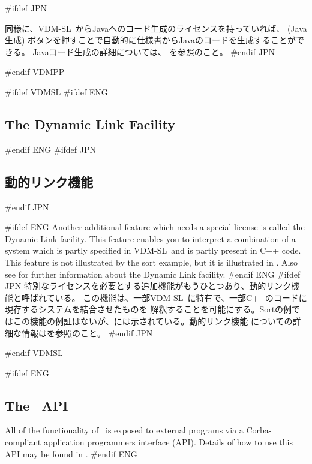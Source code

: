 \documentclass[\pformat,12pt]{article}
\newcommand{\vdmslpp}{VDM-SL}
\newcommand{\vdmslpp}{VDM++}
\newcommand{\guicmd}[1]{{\sf #1}}
\newcommand{\guicmd}[1]{{\gt #1}}
\begin{document}
#ifdef JPN

同様に、\vdmslpp\ からJavaへのコード生成のライセンスを持っていれば、
(\guicmd{Java生成}) ボタンを押すことで自動的に仕様書からJavaのコードを生成することができる。
Javaコード生成の詳細については、\cite{CGJavaManPP-CSK} を参照のこと。
#endif JPN

#endif VDMPP

#ifdef VDMSL
#ifdef ENG
\subsection{The Dynamic Link Facility}
#endif ENG
#ifdef JPN
\subsection{動的リンク機能}
#endif JPN

#ifdef ENG
Another additional feature which needs a special license
 is 
called the Dynamic Link facility. This feature
enables you to interpret a 
combination of a system which is partly specified in \vdmslpp\ and is
partly present in C++ code. This feature is not
illustrated by the sort example, but it is illustrated in
\cite{DLMan-CSK}. Also see \cite{DLMan-CSK}
for further information about the Dynamic Link facility.
#endif ENG
#ifdef JPN
特別なライセンスを必要とする追加機能がもうひとつあり、動的リンク機能と呼ばれている。
この機能は、一部\vdmslpp\ に特有で、一部C++のコードに現存するシステムを結合させたものを
解釈することを可能にする。Sortの例ではこの機能の例証はないが、\cite{DLMan-CSK}には示されている。動的リンク機能
についての詳細な情報は\cite{DLMan-CSK}を参照のこと。
#endif JPN

#endif VDMSL

#ifdef ENG
\subsection{The \protect\VDMTools\ API}

All of the functionality of \VDMTools\ is exposed to external programs
via a Corba-compliant application programmers interface (API). Details
of how to use this API may be found in \cite{APIMan-CSK}.
#endif ENG
\end{document}
